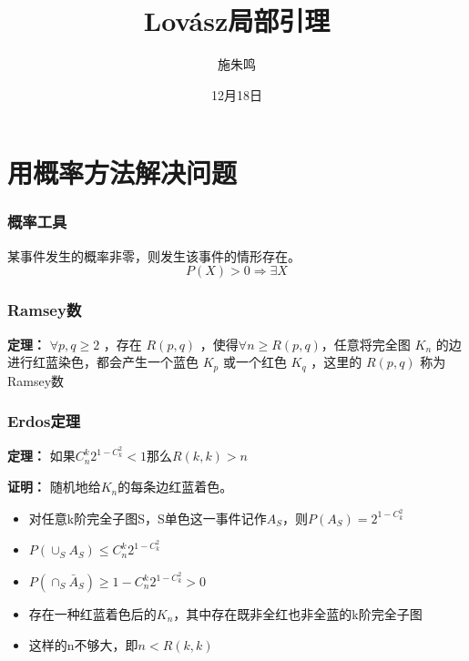 \documentclass[AutoFakeBold]{beamer}
\title{Lovász局部引理}
\author{施朱鸣}
\date{12月18日}
\begin{document}
    {
    
    \begin{frame}
    \titlepage
    \end{frame}
    
    \section{用概率方法解决问题}
    \begin{frame}
        \frametitle{概率工具}
    
        某事件发生的概率非零，则发生该事件的情形存在。
        \[P(X)>0\Rightarrow \exists X\]

    \end{frame}

    \begin{frame}
        \frametitle{Ramsey数}
    
        \textbf{定理：} \(\forall p,q\geq 2\) ，存在 \(R(p,q)\) ，使得\(\forall n \geq R(p,q)\)，任意将完全图 \(K_n\) 的边进行红蓝染色，都会产生一个蓝色 \(K_p\) 或一个红色 \(K_q\) ，这里的 \(R(p,q)\) 称为Ramsey数


    
    \end{frame}

    \begin{frame}
        \frametitle{Erdos定理}
    
        \textbf{定理：} 如果\(C_n^k2^{1-C_k^2}<1\)那么\(R(k,k)>n\)

        \textbf{证明：} 随机地给\(K_n\)的每条边红蓝着色。

        \begin{itemize}
            \item 对任意k阶完全子图S，S单色这一事件记作\(A_S\)，则\(P(A_S)=2^{1-C_k^2}\)
            \item \(P(\cup_S A_S)\leq C_n^k2^{1-C_k^2}\)
            \item \(P(\cap_S \bar{A}_S)\geq 1-C_n^k2^{1-C_k^2} > 0\)
            \item 存在一种红蓝着色后的\(K_n\)，其中存在既非全红也非全蓝的k阶完全子图
            \item 这样的n不够大，即\(n<R(k,k)\)
        \end{itemize}
    

\end{frame}}
\end{document}
